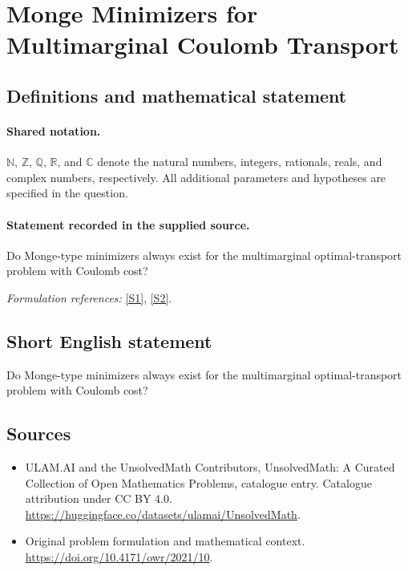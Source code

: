 \documentclass[11pt]{article}
\newcommand{\sref}[2]{\hyperlink{source:#1:#2}{[S#2]}}
\begin{document}
\section{Monge Minimizers for Multimarginal Coulomb Transport}\label{statement}

\subsection{Definitions and mathematical statement}

\paragraph{Shared notation.}$\mathbb N$, $\mathbb Z$, $\mathbb Q$, $\mathbb R$, and $\mathbb C$ denote the natural numbers, integers, rationals, reals, and complex numbers, respectively. All additional parameters and hypotheses are specified in the question.


\paragraph{Statement recorded in the supplied source.}
Do Monge-type minimizers always exist for the multimarginal optimal-transport problem with Coulomb cost?
\par\smallskip\textit{Formulation references:} \sref{statement}{1}, \sref{statement}{2}.
\subsection{Short English statement}
Do Monge-type minimizers always exist for the multimarginal optimal-transport problem with Coulomb cost?
\subsection{Sources}
\begin{itemize}
\item[\hypertarget{source:statement:1}{S1}] ULAM.AI and the UnsolvedMath Contributors, UnsolvedMath: A Curated Collection of Open Mathematics Problems, catalogue entry. Catalogue attribution under CC BY 4.0.
\url{https://huggingface.co/datasets/ulamai/UnsolvedMath}.
\item[\hypertarget{source:statement:2}{S2}] Original problem formulation and mathematical context.
\url{https://doi.org/10.4171/owr/2021/10}.
\end{itemize}
\label{end:statement}
\end{document}

